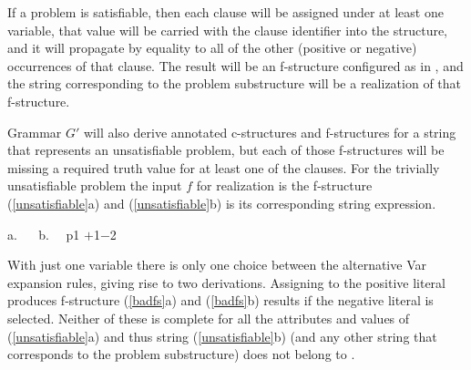 \documentclass[output=paper,hidelinks]{langscibook}
\begin{document}
If a problem is satisfiable, then each clause will be assigned  under at least one variable, that value will be carried with the clause identifier into the  structure, and it will propagate by equality to all of the other (positive or negative) occurrences of that clause.  The result will be an f-structure configured as in , and the string corresponding to the problem substructure will be a realization of that f-structure.

Grammar $G'$ will also derive annotated c-structures and f-structures for a string that represents an unsatisfiable problem, but each of those f-structures will be missing a required truth value for at least one of the clauses.  For the trivially unsatisfiable problem  the input $f$ for realization is the f-structure (\ref{unsatisfiable}a) and (\ref{unsatisfiable}b) is its corresponding string expression.

\ea\label{unsatisfiable}
a. \ \   
\hsp{3em} b. \ \  p1 $+$1$-$2
\z

\noindent With just one variable there is only one choice between the alternative Var expansion rules, giving rise to two derivations. Assigning  to the positive literal produces f-structure (\ref{badfs}a) and (\ref{badfs}b) results if the negative literal is selected. Neither of these is complete for all the attributes and values of (\ref{unsatisfiable}a) and thus string (\ref{unsatisfiable}b) (and any other string that corresponds to the problem substructure) does not belong to .
\end{document}
